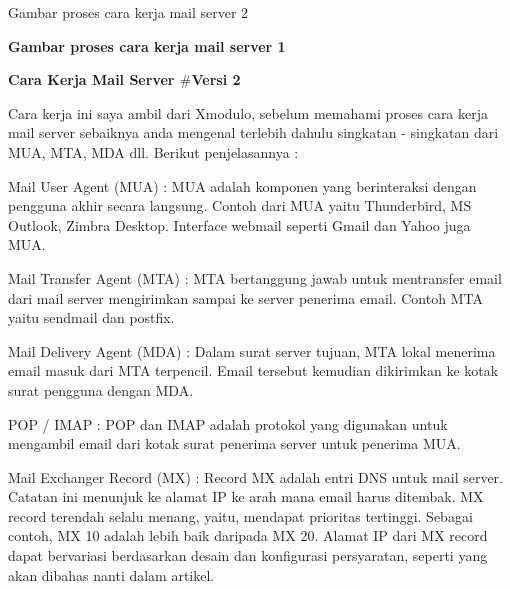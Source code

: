 \documentclass{wileySix}
\begin{document}
\begin{myEnumerate}
\begin{center}
		
		
		
	\end{center}\vspace{12pt}
	\noindent 
	\begin{center}Gambar proses cara kerja mail server 2\end{center} \par
	\vspace{12pt}
	\vspace{12pt}
	\noindent 
	\textbf{Gambar proses cara kerja mail server 1} \par
	\noindent 
	\textbf{Cara Kerja Mail Server  $  \#  $Versi 2} \par
	Cara kerja ini saya ambil dari Xmodulo, sebelum memahami proses cara kerja mail server sebaiknya anda mengenal terlebih dahulu singkatan - singkatan dari MUA, MTA, MDA dll. Berikut penjelasannya : \par
	\vspace{12pt}
	\noindent 
	\begin{myEnumerate}
		\item Mail User Agent (MUA) : MUA adalah komponen yang berinteraksi dengan pengguna akhir secara langsung. Contoh dari MUA yaitu Thunderbird, MS Outlook, Zimbra Desktop. Interface webmail seperti Gmail dan Yahoo juga MUA. \par
		\noindent 
		\item Mail Transfer Agent (MTA) : MTA bertanggung jawab untuk mentransfer email dari mail server mengirimkan sampai ke server penerima email. Contoh MTA yaitu sendmail dan postfix. \par
		\noindent 
		\item Mail Delivery Agent (MDA) : Dalam surat server tujuan, MTA lokal menerima email masuk dari MTA terpencil. Email tersebut kemudian dikirimkan ke kotak surat pengguna dengan MDA. \par
		\noindent 
		\item POP / IMAP : POP dan IMAP adalah protokol yang digunakan untuk mengambil email dari kotak surat penerima server untuk penerima MUA. \par
		\noindent 
		\item Mail Exchanger Record (MX) : Record MX adalah entri DNS untuk mail server. Catatan ini menunjuk ke alamat IP ke arah mana email harus ditembak. MX record terendah selalu menang, yaitu, mendapat prioritas tertinggi. Sebagai contoh, MX 10 adalah lebih baik daripada MX 20. Alamat IP dari MX record dapat bervariasi berdasarkan desain dan konfigurasi persyaratan, seperti yang akan dibahas nanti dalam artikel.\end{myEnumerate}
	\par
	\vspace{12pt}
	\noindent 
	\begin{center}
		

\end{center}
\end{myEnumerate}
\end{document}
